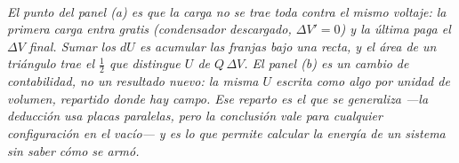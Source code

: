 \begin{center}
\\[0.5em]
{\small\itshape El punto del panel (a) es que la carga no se trae toda contra el
mismo voltaje: la primera carga entra gratis (condensador descargado,
$\Delta V'=0$) y la última paga el $\Delta V$ final. Sumar los $dU$ es acumular
las franjas bajo una recta, y el área de un triángulo trae el $\tfrac12$ que
distingue $U$ de $Q\,\Delta V$. El panel (b) es un cambio de contabilidad, no un
resultado nuevo: la misma $U$ escrita como algo por unidad de volumen, repartido
donde hay campo. Ese reparto es el que se generaliza ---la deducción usa placas
paralelas, pero la conclusión vale para cualquier configuración en el vacío--- y
es lo que permite calcular la energía de un sistema sin saber cómo se armó.}
\end{center}
